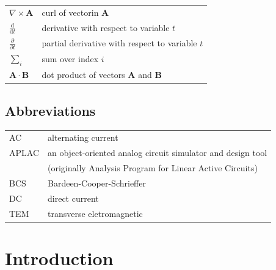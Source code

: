 \documentclass[english, 12pt, a4paper, elec, utf8, a-2b, online]{aaltothesis}
\begin{document}
\begin{tabular}{ll}
$\nabla \times \mathbf{A}$              & curl of vectorin $\mathbf{A}$\\
$\displaystyle\frac{\mbox{d}}{\mbox{d} t}$ & derivative with respect to 
variable $t$\\[3mm]
$\displaystyle\frac{\partial}{\partial t}$  & partial derivative with respect 
to variable $t$ \\[3mm]
$\sum_i $                       & sum over index $i$\\
$\mathbf{A} \cdot \mathbf{B}$    & dot product of vectors $\mathbf{A}$ and 
$\mathbf{B}$
\end{tabular}

\subsection*{Abbreviations}

\begin{tabular}{ll}
AC         & alternating current \\
APLAC      & an object-oriented analog circuit simulator and design tool \\
           & (originally Analysis Program for Linear Active Circuits) \\
BCS        & Bardeen-Cooper-Schrieffer \\ %
DC         & direct current \\
TEM        & transverse eletromagnetic
\end{tabular}


\cleardoublepage

\section{Introduction}
\label{sec:intro}

\thispagestyle{empty}

\end{document}

